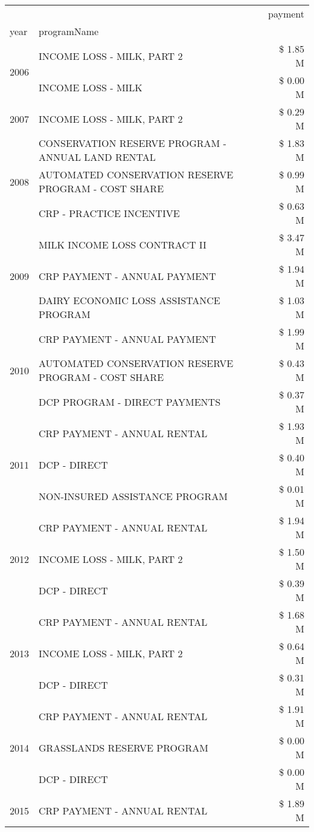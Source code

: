 \begin{tabular}{llr}
\toprule
 &  & payment \\
year & programName &  \\
\midrule
\multirow[t]{2}{*}{2006} & INCOME LOSS - MILK, PART 2 & \$ 1.85 M \\
 & INCOME LOSS - MILK & \$ 0.00 M \\
\cline{1-3}
2007 & INCOME LOSS - MILK, PART 2 & \$ 0.29 M \\
\cline{1-3}
\multirow[t]{3}{*}{2008} & CONSERVATION RESERVE PROGRAM - ANNUAL LAND RENTAL & \$ 1.83 M \\
 & AUTOMATED CONSERVATION RESERVE PROGRAM - COST SHARE & \$ 0.99 M \\
 & CRP - PRACTICE INCENTIVE & \$ 0.63 M \\
\cline{1-3}
\multirow[t]{3}{*}{2009} & MILK INCOME LOSS CONTRACT II & \$ 3.47 M \\
 & CRP PAYMENT - ANNUAL PAYMENT & \$ 1.94 M \\
 & DAIRY ECONOMIC LOSS ASSISTANCE PROGRAM & \$ 1.03 M \\
\cline{1-3}
\multirow[t]{3}{*}{2010} & CRP PAYMENT - ANNUAL PAYMENT & \$ 1.99 M \\
 & AUTOMATED CONSERVATION RESERVE PROGRAM - COST SHARE & \$ 0.43 M \\
 & DCP PROGRAM - DIRECT PAYMENTS & \$ 0.37 M \\
\cline{1-3}
\multirow[t]{3}{*}{2011} & CRP PAYMENT - ANNUAL RENTAL & \$ 1.93 M \\
 & DCP - DIRECT & \$ 0.40 M \\
 & NON-INSURED ASSISTANCE PROGRAM & \$ 0.01 M \\
\cline{1-3}
\multirow[t]{3}{*}{2012} & CRP PAYMENT - ANNUAL RENTAL & \$ 1.94 M \\
 & INCOME LOSS - MILK, PART 2 & \$ 1.50 M \\
 & DCP - DIRECT & \$ 0.39 M \\
\cline{1-3}
\multirow[t]{3}{*}{2013} & CRP PAYMENT - ANNUAL RENTAL & \$ 1.68 M \\
 & INCOME LOSS - MILK, PART 2 & \$ 0.64 M \\
 & DCP - DIRECT & \$ 0.31 M \\
\cline{1-3}
\multirow[t]{3}{*}{2014} & CRP PAYMENT - ANNUAL RENTAL & \$ 1.91 M \\
 & GRASSLANDS RESERVE PROGRAM & \$ 0.00 M \\
 & DCP - DIRECT & \$ 0.00 M \\
\cline{1-3}
\multirow[t]{3}{*}{2015} & CRP PAYMENT - ANNUAL RENTAL & \$ 1.89 M \\

\end{tabular}
